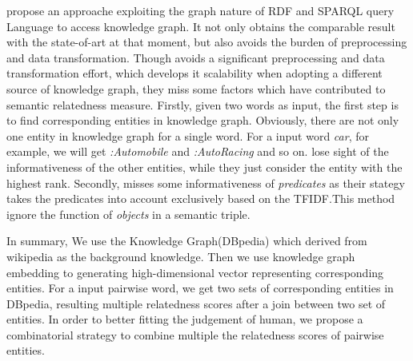 \cite{aaai/Pirro12} propose an approache exploiting the graph nature of RDF and SPARQL query
Language to access knowledge graph. It not only obtains the comparable
result with the state-of-art at that moment, but also avoids the burden
of preprocessing and data transformation.
Though \cite{aaai/Pirro12} avoids a significant preprocessing and data
transformation effort, which develops it scalability when adopting a
different source of knowledge graph, they miss some factors which
have contributed to semantic relatedness measure. Firstly, given two words
as input, the first step is to find corresponding entities in knowledge
graph. Obviously, there are not only one entity in knowledge graph for a single
word. For a input word \emph{car}, for example, we will get \emph{:Automobile} and
\emph{:Auto\underline{\hspace{0.5em}}Racing} and so on. \cite{aaai/Pirro12} lose
sight of the informativeness of the other entities, while they just
consider the entity with the highest rank. Secondly, \cite{aaai/Pirro12} misses
some informativeness of \emph{predicates} as their stategy takes
the predicates into account exclusively based on the TFIDF.This
method ignore the function of \emph{objects} in a semantic triple.

In summary, We use the Knowledge Graph(DBpedia) which derived from wikipedia as the background knowledge.
Then we use knowledge graph embedding to generating high-dimensional vector representing corresponding
entities. For a input pairwise word, we get two sets of corresponding entities in DBpedia, resulting multiple
relatedness scores after a join between two set of entities.
In order to better fitting the judgement of human, we propose a combinatorial strategy to combine
multiple the relatedness scores of pairwise entities.
